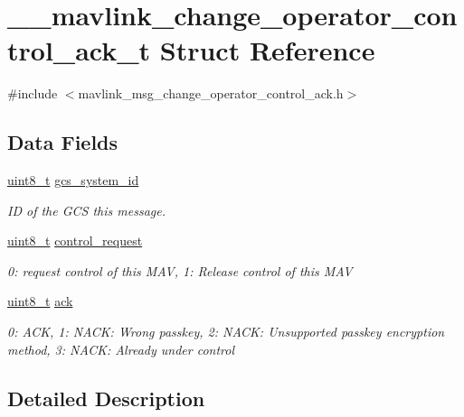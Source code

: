 \hypertarget{struct____mavlink__change__operator__control__ack__t}{\section{\-\_\-\-\_\-mavlink\-\_\-change\-\_\-operator\-\_\-control\-\_\-ack\-\_\-t Struct Reference}
\label{struct____mavlink__change__operator__control__ack__t}
}


{\ttfamily \#include $<$mavlink\-\_\-msg\-\_\-change\-\_\-operator\-\_\-control\-\_\-ack.\-h$>$}

\subsection*{Data Fields}
\begin{DoxyCompactItemize}
\item 
\hyperlink{stdint_8h_aba7bc1797add20fe3efdf37ced1182c5}{uint8\-\_\-t} \hyperlink{struct____mavlink__change__operator__control__ack__t_adb8f2a279063a0615952eda9f2b3dc24}{gcs\-\_\-system\-\_\-id}
\begin{DoxyCompactList}\small\item\em I\-D of the G\-C\-S this message. \end{DoxyCompactList}\item 
\hyperlink{stdint_8h_aba7bc1797add20fe3efdf37ced1182c5}{uint8\-\_\-t} \hyperlink{struct____mavlink__change__operator__control__ack__t_a3b0abe5ae412967c3341c6e90f09d0d6}{control\-\_\-request}
\begin{DoxyCompactList}\small\item\em 0\-: request control of this M\-A\-V, 1\-: Release control of this M\-A\-V \end{DoxyCompactList}\item 
\hyperlink{stdint_8h_aba7bc1797add20fe3efdf37ced1182c5}{uint8\-\_\-t} \hyperlink{struct____mavlink__change__operator__control__ack__t_a420017052e533270a67f82a663bc07fa}{ack}
\begin{DoxyCompactList}\small\item\em 0\-: A\-C\-K, 1\-: N\-A\-C\-K\-: Wrong passkey, 2\-: N\-A\-C\-K\-: Unsupported passkey encryption method, 3\-: N\-A\-C\-K\-: Already under control \end{DoxyCompactList}\end{DoxyCompactItemize}


\subsection{Detailed Description}


